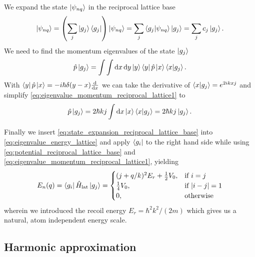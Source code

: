 We expand the state $\ket{\psi_{nq}}$ in the reciprocal lattice base
\begin{equation}
  \ket{\psi_{nq}}
  =\left(\sum_j\ket{g_j}\bra{g_j}\right)\ket{\psi_{nq}}
  =\sum_j\braket{g_j}{\psi_{nq}}\ket{g_j}
  =\sum_jc_j\ket{g_j}
  \label{eq:state_expansion_reciprocal_lattice_base}.
\end{equation}
We need to find the momentum eigenvalues of the state $\ket{g_j}$
\begin{equation}
  \hat{p}\ket{g_j}
  =\int\int\dd{x}\dd{y}\ket{y}\bra{y}\hat{p}\ket{x}\bra{x}\ket{g_j}
  \label{eq:eigenvalue_momentum_reciprocal_lattice1}.
\end{equation}
With $\bra{y}\hat{p}\ket{x}=-i\hbar\delta(y-x)\dv{x}$ we can take the
derivative of $\bra{x}\ket{g_j}=e^{2ikxj}$ and simplify
\cref{eq:eigenvalue_momentum_reciprocal_lattice1} to
\begin{equation}
  \hat{p}\ket{g_j}
  =2\hbar kj\int\dd{x}\ket{x}\bra{x}\ket{g_j}
  =2\hbar kj\ket{g_j}
  \label{eq:eigenvalue_momentum_reciprocal_lattice1}.
\end{equation}

Finally we insert \cref{eq:state_expansion_reciprocal_lattice_base} into
\cref{eq:eigenvalue_energy_lattice} and apply $\bra{g_i}$ to the right hand
side while using \cref{eq:potential_reciprocal_lattice_base} and
\cref{eq:eigenvalue_momentum_reciprocal_lattice1}, yielding
\begin{equation}
  E_n(q)
  =\bra{g_i}\hat{H}_\text{lat}\ket{g_j}
  =
  \begin{cases}
    (j+q/k)^2E_r+\frac{1}{2}V_0, & \text{if } i=j\\
    \frac{1}{4}V_0, & \text{if } \abs{i-j}=1\\
    0, & \text{otherwise}
  \end{cases}
  \label{eq:eigenvalue_energy_energy_lattice_final}
\end{equation}
wherein we introduced the recoil energy $E_r=\hbar^2k^2/(2m)$ which gives us
a natural, atom independent energy scale.

\subsection{Harmonic approximation}

